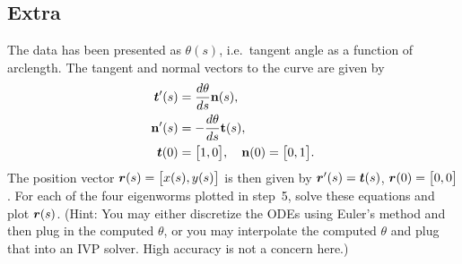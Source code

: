 \documentclass[11pt,twoside]{article}
\begin{document}
\subsection*{Extra}
The data has been presented as $\theta(s)$, i.e.\ tangent angle as a function of arclength. The tangent and normal vectors to the curve are given by
\begin{equation}
  \begin{split}
    \bm{t}'(s) &= \frac{d\theta}{ds} \mathbf{n}(s),\\
    \mathbf{n}'(s) &= -\frac{d\theta}{ds} \mathbf{t}(s), \\
    \bm{t}(0) &= \bigl[1,0\bigr], \quad \mathbf{n}(0) = \bigl[ 0,1 \bigr].
  \end{split}
\end{equation}
The position vector $\bm{r}(s)=\bigl[x(s),y(s)\bigr]$ is then given by $\bm{r}'(s)=\bm{t}(s)$, $\bm{r}(0)=\bigl[ 0,0 \bigr]$. For each of the four eigenworms plotted in step~5, solve these equations and plot $\bm{r}(s)$. (Hint: You may either discretize the ODEs using Euler's method and then plug in the computed $\theta$, or you may interpolate the computed $\theta$ and plug that into an IVP solver. High accuracy is not a concern here.)
\end{document}
